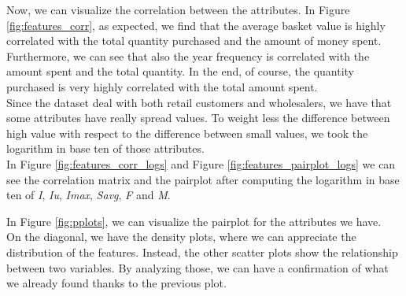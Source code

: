 Now, we can visualize the correlation between the attributes. In Figure \ref{fig:features_corr}, as expected, we find that the average basket value is highly correlated with the total quantity purchased and the amount of money spent. Furthermore, we can see that also the year frequency is correlated with the amount spent and the total quantity. In the end, of course, the quantity purchased is very highly correlated with the total amount spent. \\
Since the dataset deal with both retail customers and wholesalers, we have that some attributes have really spread values. To weight less the difference between high value with respect to the difference between small values, we took the logarithm in base ten of those attributes.\\
In Figure \ref{fig:features_corr_logs} and Figure \ref{fig:features_pairplot_logs} we can see the correlation matrix and the pairplot after computing the logarithm in base ten of \emph{I}, \emph{Iu}, \emph{Imax}, \emph{Savg}, \emph{F} and \emph{M}.

In Figure \ref{fig:pplots}, we can visualize the pairplot for the attributes we have.\\
On the diagonal, we have the density plots, where we can appreciate the distribution of the features. Instead, the other scatter plots show the relationship between two variables. By analyzing those, we can have a confirmation of what we already found thanks to the previous plot. 


